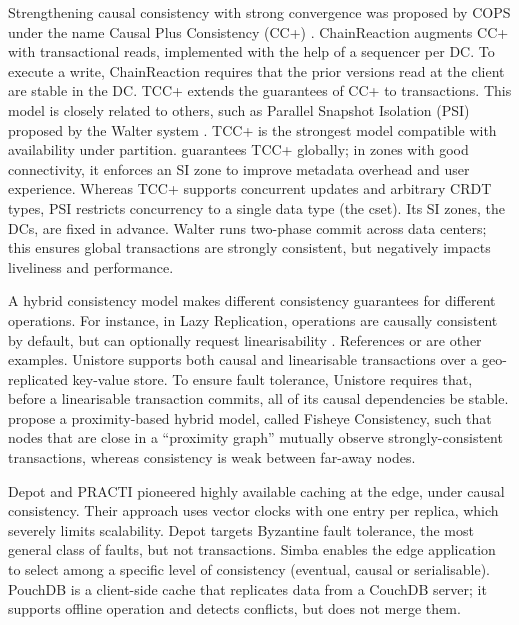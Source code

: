 Strengthening causal consistency with strong convergence was proposed by
COPS under the name Causal Plus Consistency (CC+) \cite{rep:syn:1662}.
ChainReaction augments CC+ with transactional reads, implemented with
the help of a sequencer per DC.
To execute a write, ChainReaction requires that the prior versions read at the client are stable in the DC.
%
TCC+ \cite{rep:pro:sh182} extends the guarantees of CC+ to transactions.
This model is closely related to others, such as Parallel Snapshot
Isolation (PSI) proposed by the Walter system \cite{rep:syn:1661}.
TCC+ is the strongest model compatible with availability under partition.
\system{} guarantees TCC+ globally; in zones with good connectivity,
it enforces an SI zone to
improve metadata overhead and user experience.
Whereas TCC+ supports concurrent updates and arbitrary CRDT types, PSI
restricts concurrency to a single data type (the cset).
Its SI zones, the DCs, are fixed in advance.
Walter runs two-phase commit across data centers; this ensures global
transactions are strongly consistent, but negatively impacts liveliness
and performance.

A hybrid consistency model makes different consistency guarantees for
different operations.
For instance, in Lazy Replication, operations are causally consistent by
default, but can optionally request linearisability \cite{pan:rep:1146}.
References
\citealp{alg:rep:syn:optim:1464,rep:syn:sh167} or \citealp{rep:syn:1690}
are other examples.
%
Unistore \cite{unistore} supports both causal and linearisable
transactions over a geo-replicated key-value store.
To ensure fault tolerance, Unistore requires that, before a linearisable
transaction commits, all of its causal dependencies be stable.
%
\citet{fisheye} propose a proximity-based hybrid model, called Fisheye
Consistency, such that nodes that are close in a ``proximity graph''
mutually observe strongly-consistent transactions, whereas consistency
is weak between far-away nodes.

Depot \cite{rep:1712} and PRACTI \cite{rep:syn:1729} pioneered
highly available caching at the edge, under causal consistency.
Their approach uses vector clocks with one entry per replica, which severely
limits scalability.
Depot targets Byzantine fault tolerance, the most general class of
faults, but not transactions.
Simba \cite{fic:syn:1731} enables the edge application to select among a
specific level of consistency (eventual, causal or serialisable).
PouchDB \cite{pouchDB} is a client-side cache that replicates data
from a CouchDB server; it supports offline operation and detects
conflicts, but does not merge them.


